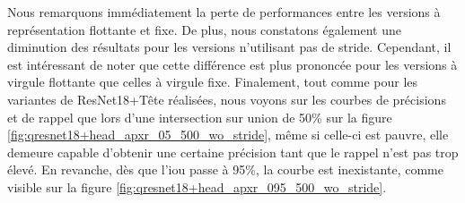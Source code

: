 \break

Nous remarquons immédiatement la perte de performances entre les versions à représentation flottante et fixe. De plus, nous constatons également une diminution des résultats pour les versions n'utilisant pas de stride. Cependant, il est intéressant de noter que cette différence est plus prononcée pour les versions à virgule flottante que celles à virgule fixe. Finalement, tout comme pour les variantes de ResNet18+Tête réalisées, nous voyons sur les courbes de précisions et de rappel que lors d'une intersection sur union de 50\% sur la figure \ref{fig:qresnet18+head_apxr_05_500_wo_stride}, même si celle-ci est pauvre, elle demeure capable d'obtenir une certaine précision tant que le rappel n'est pas trop élevé. En revanche, dès que l'\acrshort{iou} passe à 95\%, la courbe est inexistante, comme visible sur la figure \ref{fig:qresnet18+head_apxr_095_500_wo_stride}.

